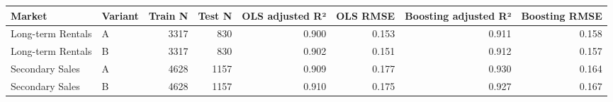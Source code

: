 \begin{tabular}{llrrrrrr}
\toprule
Market & Variant & Train N & Test N & OLS adjusted R² & OLS RMSE & Boosting adjusted R² & Boosting RMSE \\
\midrule
Long-term Rentals & A & 3317 & 830 & 0.900 & 0.153 & 0.911 & 0.158 \\
Long-term Rentals & B & 3317 & 830 & 0.902 & 0.151 & 0.912 & 0.157 \\
Secondary Sales & A & 4628 & 1157 & 0.909 & 0.177 & 0.930 & 0.164 \\
Secondary Sales & B & 4628 & 1157 & 0.910 & 0.175 & 0.927 & 0.167 \\
\bottomrule
\end{tabular}
